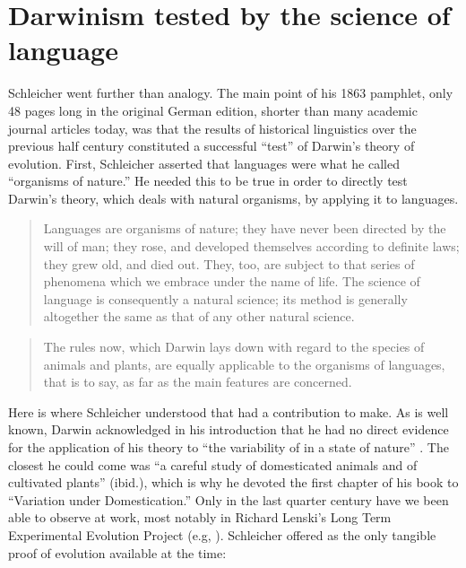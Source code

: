 \documentclass[output=paper,
modfonts
]{LSP/langsci}
\begin{document}
\section[Darwinism tested by the science of language]{Darwinism tested by the science of language}

Schleicher went further than analogy.  The main point of his 1863 pamphlet, only 48 pages long in the original German edition, shorter than many academic journal articles today, was that the results of historical linguistics over the previous half century constituted a successful ``test'' of Darwin's theory of evolution. First, Schleicher asserted that languages were what he called ``organisms of nature.'' He needed this to be true in order to directly test Darwin's theory, which deals with natural organisms, by applying it to languages.

\begin{quote}
Languages are organisms of nature; they have never been directed by the will of man; they rose, and developed themselves according to definite laws; they grew old, and died out. They, too, are subject to that series of phenomena which we embrace under the name of {\textquotedbl}life.{\textquotedbl} The science of language is consequently a natural science; its method is generally altogether the same as that of any other natural science. \citep[20--21]{Schleicher1863}
\end{quote}

\begin{quote}
The rules now, which Darwin lays down with regard to the species of animals and plants, are equally applicable to the organisms of languages, that is to say, as far as the main features are concerned. \citep[30]{Schleicher1863}
\end{quote}

Here is where Schleicher understood that  had a contribution to make.  As is well known, Darwin acknowledged in his introduction that he had no direct evidence for the application of his theory to ``the variability of  in a state of nature'' \citep[4]{Schleicher1863}. The closest he could come was ``a careful study of domesticated animals and of cultivated plants'' (ibid.), which is why he devoted the first chapter of his book to ``Variation under Domestication.'' Only in the last quarter century have we been able to observe  at work, most notably in Richard Lenski's Long Term Experimental Evolution Project (e.g, \citealp{Tenaillonetal2016}). Schleicher offered  as the only tangible proof of evolution available at the time:
\end{document}
